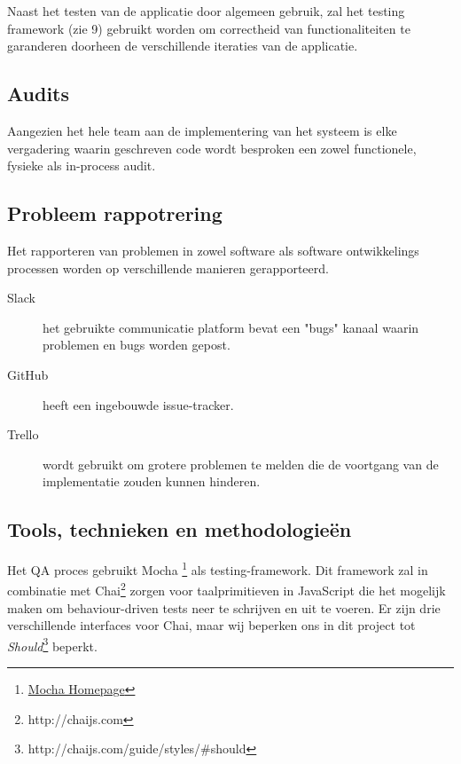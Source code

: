 Naast het testen van de applicatie door algemeen gebruik, zal het testing framework (zie 9) gebruikt worden om correctheid van functionaliteiten te garanderen doorheen de verschillende iteraties van de applicatie. 

\subsection{Audits}

Aangezien het hele team aan de implementering van het systeem is elke vergadering waarin geschreven code wordt besproken een zowel functionele, fysieke als in-process audit.

\begin{comment}

\subsection{Test}
Niet van toepassing (SVVP (Software Verification an Validation Plan) niet vereist)

\end{comment}

\subsection{Probleem rappotrering}
Het rapporteren van problemen in zowel software als software ontwikkelings processen worden op verschillende manieren gerapporteerd.
\begin{description}
\item[Slack] het gebruikte communicatie platform bevat een "bugs" kanaal waarin problemen en bugs worden gepost.
\item[GitHub] heeft een ingebouwde issue-tracker.
\item[Trello] wordt gebruikt om grotere problemen te melden die de voortgang van de implementatie zouden kunnen hinderen.

\end{description}

\subsection{Tools, technieken en methodologieën}

Het QA proces gebruikt Mocha \footnote{\href{https://github.com/mochajs}{Mocha Homepage}} als testing-framework. Dit framework zal in combinatie met Chai\footnote{http://chaijs.com} zorgen voor taalprimitieven in JavaScript die het mogelijk maken om behaviour-driven tests neer te schrijven en uit te voeren. Er zijn drie verschillende interfaces voor Chai, maar wij beperken ons in dit project tot \textit{Should}\footnote{http://chaijs.com/guide/styles/#should} beperkt.

